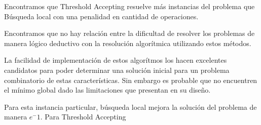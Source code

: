 \documentclass[a4paper,spanish]{article}
\begin{document}
Encontramos que Threshold Accepting resuelve más instancias del problema que
Búsqueda local con una penalidad en cantidad de operaciones.

Encontramos que no hay relación entre la dificultad de resolver los problemas de
manera lógico deductivo con la resolución algorítmica utilizando estos métodos.

La facilidad de implementación de estos algorítmos los hacen excelentes
candidatos para poder determinar una solución inicial para un problema
combinatorio de estas características. Sin embargo es probable que no encuentren
el mínimo global dado las limitaciones que presentan en su diseño.


Para esta instancia particular, búsqueda local mejora la solución del problema
de manera $e^-1$.
Para Threshold Accepting 


\end{document}
